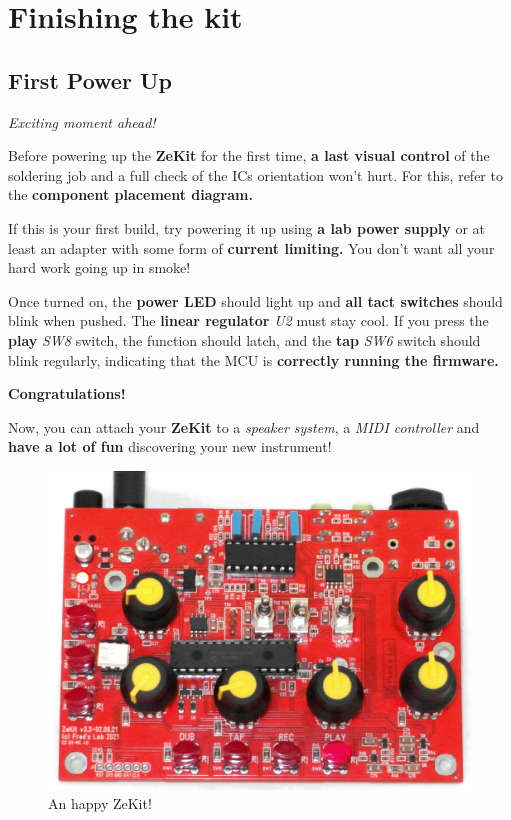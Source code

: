 \documentclass{scrartcl}
\begin{document}
\pagebreak
\section{Finishing the kit}

\subsection{First Power Up}
\Large
\emph{Exciting moment ahead!}
\normalsize

Before powering up the \textbf{ZeKit} for the first time, \textbf{a last visual control} of the soldering job and a full check of the ICs orientation won't hurt.
For this, refer to the \textbf{component placement diagram.} 

If this is your first build, try powering it up using \textbf{a lab power supply} or at least an adapter with some form of \textbf{current limiting.}
You don't want all your hard work going up in smoke!

Once turned on, the \textbf{power LED} should light up and \textbf{all tact switches} should blink when pushed. The \textbf{linear regulator} \emph{U2} must stay cool.
If you press the \textbf{play} \emph{SW8} switch, the function should latch, and the \textbf{tap} \emph{SW6} switch should blink regularly, indicating that the MCU is \textbf{correctly running the firmware.}

\vspace{0.5cm}
\textbf{Congratulations!}

Now, you can attach your \textbf{ZeKit} to a \emph{speaker system}, a \emph{MIDI controller} and \textbf{have a lot of fun} discovering your new instrument!

\begin{figure}[!ht]
    \begin{center}
        \includegraphics[scale=0.28]{assets/zekit-happy.jpg}
        \caption{An happy ZeKit!}
    \end{center}
\end{figure}
\end{document}
